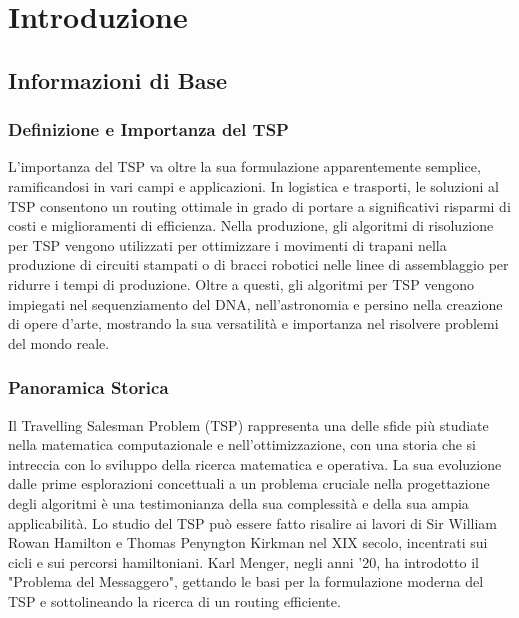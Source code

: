
%

\chapter{Introduzione}
\label{chapt:1}


\epigraphfontsize{\small\itshape}
\setlength\epigraphwidth{12.5cm}
\setlength\epigraphrule{0pt}

\section{Informazioni di Base}

\subsection{Definizione e Importanza del TSP}

L'importanza del \Gls{TSP} va oltre la sua formulazione apparentemente semplice, ramificandosi in vari campi e applicazioni. In logistica e trasporti, le
soluzioni al \Gls{TSP} consentono un routing ottimale in grado di portare a
significativi risparmi di costi e miglioramenti di efficienza. Nella
produzione, gli algoritmi di risoluzione per \Gls{TSP} vengono utilizzati per ottimizzare i
movimenti di trapani nella produzione di circuiti stampati o di bracci
robotici nelle linee di assemblaggio per ridurre i tempi di produzione.
Oltre a questi, gli algoritmi per \Gls{TSP} vengono impiegati nel sequenziamento del
DNA, nell'astronomia e persino nella creazione di opere d'arte, mostrando
la sua versatilità e importanza nel risolvere problemi del mondo reale.

\subsection{Panoramica Storica}

Il Travelling Salesman Problem (\Gls{TSP}) rappresenta una delle sfide più studiate nella matematica computazionale e nell'ottimizzazione, con una storia che si intreccia con lo sviluppo della ricerca matematica e operativa. La sua evoluzione dalle prime esplorazioni concettuali a un problema cruciale nella progettazione degli algoritmi è una testimonianza della sua complessità e della sua ampia applicabilità.
Lo studio del \Gls{TSP} può essere fatto risalire ai lavori di Sir William Rowan Hamilton e Thomas Penyngton Kirkman nel XIX secolo, incentrati sui cicli e sui percorsi hamiltoniani. Karl Menger, negli anni '20, ha introdotto il "Problema del Messaggero", gettando le basi per la formulazione moderna del \Gls{TSP} e sottolineando la ricerca di un routing efficiente.

